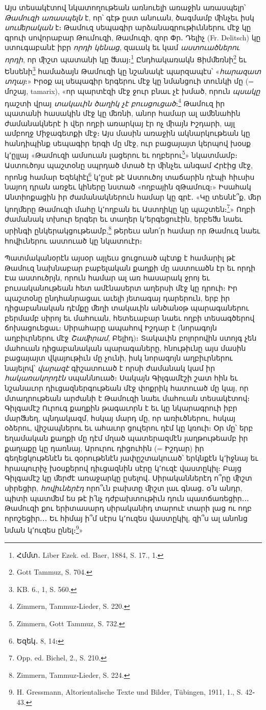 \documentclass{article}
\begin{document}
{Այս տեսակէտով նկատողութեան առնուելի առաջին առասպելր՝ \emph{Թամուզի առասպելն} է, որ՝ գէթ ըստ անուան, ծագմամբ ﬕնչեւ իսկ \emph{սուﬔրական} է։ Թամուզ սեպագիր արձանագրութիւններու մէջ կը գրուի սովորաբար Թումուզի, Թամուզի, զոր Փր․ Դելիչ (Fr. Delitsch) կը ստուգաբանէ իբր \emph{որդի կենաց}, զաւակ եւ կամ \emph{աստուածներու որդի}, որ ﬕշտ պատանի կը ﬓայ։\footnote{Հմմտ․ Liber Ezek. ed. Baer, 1884, S. 17., 1.} Ընդհակառակն Ցիմﬔռնի\footnote{Gott Tammuz, S. 704.} եւ Ենսենի\footnote{KB. 6., 1, S. 560.} համաձայն Թամուզի կը նշանակէ պարզապէս՝ «\emph{հարազատ տղայ}։» Իրօք ալ սեպագիր երգերու մէջ կը նմանցուի տունկի մը (= մոշայ, tamarix), «որ պարտէզի մէջ ջուր բնաւ չէ խմած, որուն \emph{պսակը} դաշտի վրայ \emph{տակաւին ծաղիկ չէ բուսցուցած}։\footnote{Zimmern, Tammuz֊Lieder, S. 220.} Թամուզ իր պատանի հասակին մէջ կը ﬔռնի, անոր համար ալ աﬔնահին ժամանակներէ ի վեր ողբի առարկայ էր ոչ ﬕայն Իշդարի, այլ ամբողջ Միջագետքի մէջ։ Այս մասին առաջին ակնարկութեան կը հանդիպինք սեպագիր երգի մը մէջ, ուր բացայայտ կերպով խօսք կ՚ըլլայ «Թամուզի ամսուան լացերու եւ ողբերու\footnote{Zimmern, Gott Tammuz, S. 732.}» նկատմամբ։ Աստուծոյս պաշտօնը սպրդած մտած էր ﬕնչեւ անգամ Հրէից մէջ, որոնց համար Եզեկիէլ\footnote{Եզեկ․ 8, 14։} կ՚ըսէ թէ Աստուծոյ տաճարին դէպի հիւսիս նայող դրան առջեւ կիները նստած «ողբային զԹամուզ։» Իսահակ Անտիոքացին իր ժամանակներուն համար կը գրէ․ «Կը տեսնէ՞ք, ﬔր կողﬔրը Թամուզի մահը կ՚ողբան եւ Աստղիկը կը պաշտեն։\footnote{Opp. ed. Bichel, 2., S. 210.}» Ողբի ժամանակ տխուր երգեր եւ տաղեր կ՚երգեցուէին, երբեﬓ նաեւ սրինգի ընկերակցութեամբ,\footnote{Zimmern, Tammuz֊Lieder, S. 224.} թերեւս անո՛ր համար որ Թամուզ նաեւ հովիւներու աստուած կը նկատուէր։

Պատմականօրէն այսօր այլեւս ցուցուած պէտք է համարիլ թէ Թամուզ նախնաբար բաբելական քաղքի մը աստուածն էր եւ որդի Էա աստուծրյն, որուն համար ալ առ հասարակ ջրոյ եւ բուսականութեան հետ ամէնասերտ աղերսի մէջ կը դրուի։ Իր պաշտօնը ընդհանրացաւ աւելի յետագայ դարերուն, երբ իր դիցաբանական դէմքը ﬔղի տակաւին անծանօթ պարագաներու բերմամբ սիրոյ եւ մահուան, հետեւաբար նաեւ ողբի տեսագծերով ճոխացուեցաւ։ Սիրահարը ապահով Իշդար է (նորագոյն աղբիւրներու մէջ \emph{Շաﬕրամ}, Բելիդ)։ Տակաւին բոլորովին ստոյգ չեն մահուան դիցաբանական պարագաները, հնութիւնը այս մասին բացայայտ վկայութիւն մը չունի, իսկ նորագոյն աղբիւրներու նայելով՝ \emph{վարազէ} գիշատուած է որսի ժամանակ կամ իր \emph{հակառակորդէն} սպաննուած։ Սակայն Գիլգամէշի շատ հին եւ նշանաւոր դիւցազներգութեան մէջ փոքրիկ հատուած մը կայ, որ մտադրութեան արժանի է Թամուզի նաեւ մահուան տեսակէտով։ Գիլգամէշ Ուրուգ քաղքին թագաւորն է եւ կը նկարագրուի իբր մարﬓեղ, պնդակազմ, հսկայ մարդ մը, որ առիւծներու, հսկայ օձերու, վիշապներու եւ ահաւոր ցուլերու դէմ կը կռուի։ Օր մը՝ երբ եղամական քաղքի մը դէմ մղած պատերազմէն յաղթութեամբ իր քաղաքը կը դառնայ, Արուրու դիցուհին (= Իշդար) իր գեղեցկութենէն եւ զօրութենէն յափըշտակուած՝ երկնքէն կ՚իջնայ եւ հրապուրիչ խօսքերով դիւցազնին սէրը կ՚ուզէ վաստըկիլ։ Բայց Գիլգամէշ կը ﬔրժէ առաջարկը ըսելով․ Սիրականներէդ ո՞րը ﬕշտ սիրեցիր, \emph{հովիւներէդ} որո՞ւն բախտը ﬕշտ լաւ գնաց․ օ՛ն անդր, պիտի պատﬔմ ես թէ ի՛նչ դժբախտութիւն դուն պատճառեցիր․․․ Թամուզի քու երիտասարդ սիրականիդ տարուէ տարի լաց ու ողբ որոշեցիր․․․ Եւ հիմայ ի՞մ սէրս կ՚ուզես վաստըկիլ, զի՞ս ալ անոնց նման կ՚ուզես ընել։\footnote{H. Gressmann, Altorientalische Texte und Bilder, Tübingen, 1911, 1., S. 42֊43.}»

}
\end{document}
